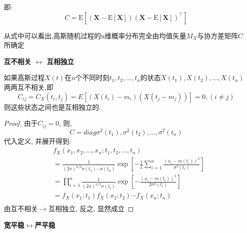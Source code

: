 \documentclass{article}
\begin{document}
即:
$$
C=\mathrm{E}
\left[
 \left(
 \textbf{X} - \mathrm{E}[\textbf{X}]
 \right)
 \left(
 \textbf{X} - \mathrm{E}[\textbf{X}]
 \right)^\top
\right]
$$

从式中可以看出,高斯随机过程的n维概率分布完全由均值矢量$M_X$与协方差矩阵$C$所确定

\textbf{互不相关 $\leftrightarrow$ 互相独立}
\begin{theorem}
如果高斯过程$X(t)$在$n$个不同时刻$t_1, t_2, \ldots, t_n$的状态$X(t_1), X(t_2), \ldots, X(t_n)$两两互不相关,即
$$
C_{ij} = C_X(t_i, t_j) = E[(X(t_i) - m_i)(X(t_j - m_j))] = 0, (i \neq j)
$$
则这些状态之间也是互相独立的.
\end{theorem}
\begin{proof}
由于$C_{ij} = 0$, 则, 
$$ C = diag{\sigma^2(t_1), \sigma^2(t_2), \ldots, \sigma^2(t_n)}$$
代入定义, 并展开得到:
$$
\begin{aligned}
& f_X(x_1, x_2, \ldots, x_n; t_1, t_2, \ldots, t_n) \\
& = \frac{1}{(2\pi)^{n/2} \sigma(t_1) \cdots \sigma(t_n)} \exp[-\frac{1}{2} \sum_{i=1}^n \frac{(x_i - m(t_i))^2}{\sigma^2(t_i)}]\\
& = \prod_{i=1}^n \frac{1}{(2\pi)^{n/2} \sigma(t_i)} \exp[-\frac{(x_i - m(t_i))^2}{2 \sigma^2(t_i)}]\\
& = f_X(x_1; t_1) f_X(x_2; t_2) \cdots f_X(x_n; t_n)\\
\end{aligned}
$$
由互不相关$\rightarrow$互相独立, 反之, 显然成立
\end{proof}

\textbf{宽平稳$\leftrightarrow$严平稳}
\begin{theorem}
\end{theorem}
\end{document}
